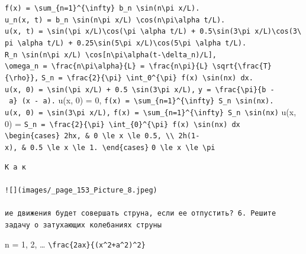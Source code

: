 \documentclass[
  ukrainian,
]{article}
\begin{document}
\texttt{f(x)\ =\ \textbackslash{}sum\_\{n=1\}\^{}\{\textbackslash{}infty\}\ b\_n\ \textbackslash{}sin(n\textbackslash{}pi\ x/L).}
\texttt{u\_n(x,\ t)\ =\ b\_n\ \textbackslash{}sin(n\textbackslash{}pi\ x/L)\ \textbackslash{}cos(n\textbackslash{}pi\textbackslash{}alpha\ t/L).}
\texttt{u(x,\ t)\ =\ \textbackslash{}sin(\textbackslash{}pi\ x/L)\textbackslash{}cos(\textbackslash{}pi\ \textbackslash{}alpha\ t/L)\ +\ 0.5\textbackslash{}sin(3\textbackslash{}pi\ x/L)\textbackslash{}cos(3\textbackslash{}pi\ \textbackslash{}alpha\ t/L)\ +\ 0.25\textbackslash{}sin(5\textbackslash{}pi\ x/L)\textbackslash{}cos(5\textbackslash{}pi\ \textbackslash{}alpha\ t/L).}
\texttt{R\_n\ \textbackslash{}sin(n\textbackslash{}pi\ x/L)\ \textbackslash{}cos{[}n\textbackslash{}pi\textbackslash{}alpha(t-\textbackslash{}delta\_n)/L{]},}
\texttt{\textbackslash{}omega\_n\ =\ \textbackslash{}frac\{n\textbackslash{}pi\textbackslash{}alpha\}\{L\}\ =\ \textbackslash{}frac\{n\textbackslash{}pi\}\{L\}\ \textbackslash{}sqrt\{\textbackslash{}frac\{T\}\{\textbackslash{}rho\}\},}
\texttt{S\_n\ =\ \textbackslash{}frac\{2\}\{\textbackslash{}pi\}\ \textbackslash{}int\_0\^{}\{\textbackslash{}pi\}\ f(x)\ \textbackslash{}sin(nx)\ dx.}
\texttt{u(x,\ 0)\ =\ \textbackslash{}sin(\textbackslash{}pi\ x/L)\ +\ 0.5\ \textbackslash{}sin(3\textbackslash{}pi\ x/L),}
\texttt{y\ =\ \textbackslash{}frac\{\textbackslash{}pi\}\{b\ -\ a\}\ (x\ -\ a).}
u(x, 0) = 0,
\texttt{f(x)\ =\ \textbackslash{}sum\_\{n=1\}\^{}\{\textbackslash{}infty\}\ S\_n\ \textbackslash{}sin(nx).}
\texttt{u(x,\ 0)\ =\ \textbackslash{}sin(3\textbackslash{}pi\ x/L),}
\texttt{f(x)\ =\ \textbackslash{}sum\_\{n=1\}\^{}\{\textbackslash{}infty\}\ S\_n\ \textbackslash{}sin(nx)}
u(x, 0) =
\texttt{S\_n\ =\ \textbackslash{}frac\{2\}\{\textbackslash{}pi\}\ \textbackslash{}int\_\{0\}\^{}\{\textbackslash{}pi\}\ f(x)\ \textbackslash{}sin(nx)\ dx}
\texttt{\textbackslash{}begin\{cases\}\ 2hx,\ \&\ 0\ \textbackslash{}le\ x\ \textbackslash{}le\ 0.5,\ \textbackslash{}\textbackslash{}\ 2h(1-x),\ \&\ 0.5\ \textbackslash{}le\ x\ \textbackslash{}le\ 1.\ \textbackslash{}end\{cases\}}
\texttt{0\ \textbackslash{}le\ x\ \textbackslash{}le\ \textbackslash{}pi}

\begin{verbatim}
К а к

![](images/_page_153_Picture_8.jpeg)

ие движения будет совершать струна, если ее отпустить? 6. Решите задачу о затухающих колебаниях струны
\end{verbatim}

n = 1, 2, \ldots{}
\texttt{\textbackslash{}frac\{2ax\}\{(x\^{}2+a\^{}2)\^{}2\}}
\end{document}

